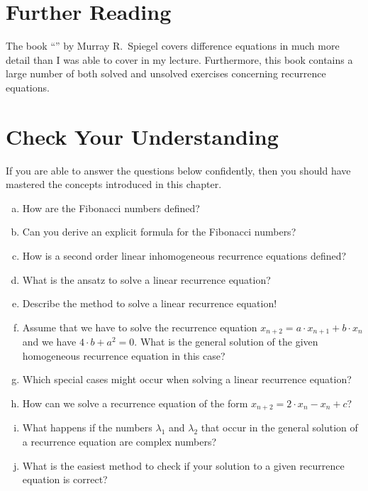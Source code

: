 \section{Further Reading}
The book ``'' by Murray R.~Spiegel
\cite{spiegel:1971} covers difference equations in much more detail than I was able to cover in my lecture.
Furthermore, this book contains a large number of both solved and unsolved exercises concerning
recurrence equations. 

\section{Check Your Understanding}
If you are able to answer the questions below confidently, then you should have mastered the concepts
introduced in this chapter.
\begin{enumerate}[(a)]
\item How are the Fibonacci numbers defined?
\item Can you derive an explicit formula for the Fibonacci numbers?
\item How is a second order linear inhomogeneous recurrence equations defined?  
\item What is the ansatz to solve a linear  recurrence equation?
\item Describe the method to solve a linear  recurrence equation!
\item Assume that we have to solve the recurrence equation $x_{n+2} = a \cdot x_{n+1} + b \cdot x_n$
      and we have $4 \cdot b + a^2 = 0$.  What is the general solution of the given homogeneous
      recurrence equation in this case?
\item Which special cases might occur when solving a linear recurrence equation?
\item How can we solve a recurrence equation of the form $x_{n+2} = 2 \cdot x_n - x_n + c$?
\item What happens if the numbers $\lambda_1$ and $\lambda_2$ that occur in the general solution
      of a recurrence equation are complex numbers?
\item What is the easiest method to check if your solution to a given recurrence equation is correct?  
\end{enumerate}


